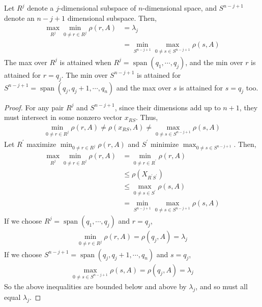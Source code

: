 \documentclass[11pt]{article}
\numberwithin{equation}{section}
\begin{document}
\begin{theorem}
    Let $R^j$ denote a $j$-dimensional subspace of $n$-dimensional space, and $S^{n-j+1}$ denote an $n-j+1$ dimensional subspace. Then,\begin{align*}
        \max_{R^{j}} \min_{0 \neq r \in R^{j}} \rho(r,A) &= \lambda_j \\
        &= \min_{S^{n-j+1}} \max_{0 \neq s \in S^{n-j+1}} \rho(s, A)
    \end{align*}
    The max over $R^j$ is attained when $R^j = \operatorname{span}(q_1,\cdots,q_j)$, and the min over $r$ is attained for $r = q_j$. 
    The min over $S^{n-j+1}$ is attained for $S^{n-j+1} = \operatorname{span}(q_j,q_j+1,\cdots,q_n)$ and the max over $s$ is attained for $s = q_j$ too.
    \begin{proof}
        For any pair $R^j$ and $S^{n-j+1}$, since their dimensions add up to $n+1$, they must intersect in some nonzero vector $x_{RS}$. Thus, \begin{align*}
            \min_{0 \neq r \in R^{j}} \rho(r,A) \neq \rho(x_{RS}, A) \neq \max_{0 \neq s \in S^{n-j+1}} \rho(s, A)
        \end{align*}
        Let $R^\prime$ maximize $\min_{0 \neq r \in R^{j}} \rho(r,A)$ and $S^\prime$ minimize $\max_{0 \neq s \in S^{n-j+1}}$. Then, \begin{align*}
            \max_{R^{j}} \min_{0 \neq r \in R^{j}} \rho(r,A) &= \min_{0 \neq r \in R^{\prime}} \rho(r,A) \\
            &\leq \rho(X_{R^{\prime}S^\prime}) \\
            &\leq \max_{0 \neq s \in S^{\prime}} \rho(s, A) \\
            &= \min_{S^{n-j+1}} \max_{0 \neq s \in S^{n-j+1}} \rho(s, A)
        \end{align*}
        If we choose $R^j=\operatorname{span}(q_1,\cdots,q_j)$ and $r=q_j$, \begin{align*}
            \min_{0 \neq r \in R^{j}} \rho(r,A) = \rho(q_j, A) = \lambda_j
        \end{align*}
        If we choose $S^{n-j+1} = \operatorname{span}(q_j,q_j+1,\cdots,q_n)$ and $s=q_j$, \begin{align*}
            \max_{0 \neq s \in S^{n-j+1}} \rho(s, A) = \rho(q_j, A) = \lambda_j
        \end{align*}
        So the above inequalities are bounded below and above by $\lambda_j$, and so must all equal $\lambda_j$.
    \end{proof}
\end{theorem}
\end{document}
